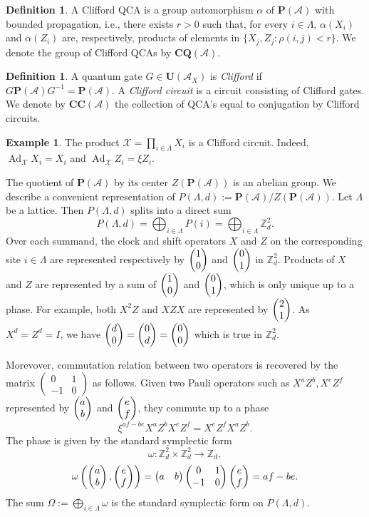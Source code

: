 \documentclass{article}
\theoremstyle{definition}
\newtheorem{defn}[theorem]{Definition}
\newtheorem{exmp}[theorem]{Example}
\newcommand*\colvec[3][]{
    \begin{pmatrix}\ifx\relax#1\relax\else#1\\\fi#2\\#3\end{pmatrix}
}
\DeclareMathOperator{\Ad}{Ad}
\newcommand{\ZZ}{{\mathbb Z}}
\newcommand{\SA}{{\mathscr A}}
\begin{document}
\begin{defn} \label{defn: CQ}
    A Clifford QCA is a group automorphism $\alpha$ of $\mathbf P(\SA)$ with bounded propagation, i.e., there exists $r>0$ such that, for every $i\in \Lambda$, $\alpha(X_i)$ and $\alpha(Z_i)$ are, respectively, products of elements in $\{X_j, Z_j: \rho(i,j)<r\}$. We denote the group of Clifford QCAs by $\mathbf{CQ}(\SA)$. 
\end{defn}
\begin{defn}
    A quantum gate $G\in \mathbf U(\SA_X)$ is \textit{Clifford} if $G\mathbf P(\SA)G^{-1}=\mathbf P(\SA)$. A \textit{Clifford circuit} is a circuit consisting of Clifford gates. We denote by $\mathbf{CC}(\SA)$ the collection of QCA's equal to conjugation by Clifford circuits.
\end{defn}
\begin{exmp}
    The product $\mathcal X=\prod_{i\in \Lambda}X_i$ is a Clifford circuit. Indeed, $\Ad_\mathcal{X} X_i=X_i$ and $\Ad_\mathcal{X} Z_i=\xi Z_i.$ 
\end{exmp}

The quotient of $\mathbf P(\SA)$ by its center $Z(\mathbf P(\SA))$ is an abelian group. We describe a convenient representation of $P(\Lambda, d):=\mathbf P(\SA)/Z(\mathbf P(\SA))$. Let $\Lambda$ be a lattice. Then $P(\Lambda, d)$ splits into a direct sum $$P(\Lambda, d)=\bigoplus_{i\in \Lambda} P(i)=\bigoplus_{i\in \Lambda} \ZZ_d^2.$$ Over each summand, the clock and shift operators $X$ and $Z$ on the corresponding site $i\in \Lambda$ are represented respectively by $\colvec{1}{0}$ and $\colvec{0}{1}$ in $\ZZ_d^2$. Products of $X$ and $Z$ are represented by a sum of $\colvec{1}{0}$ and $\colvec{0}{1}$, which is only unique up to a phase. For example, both $X^2Z$ and $XZX$ are represented by $\colvec{2}{1}$. As $X^d= Z^d= I$, we have $\colvec{d}{0}=\colvec{0}{d}=\colvec{0}{0}$ which is true in $\ZZ_d^2.$

Morevover, commutation relation between two operators is recovered by the matrix $\begin{pmatrix}
    0 & 1\\
    -1 & 0
\end{pmatrix}$ as follows. Given two Pauli operators such as $X^aZ^b, X^eZ^f$ represented by $\colvec{a}{b}$ and $\colvec{e}{f}$, they commute up to a phase
$$\xi^{af-be}X^aZ^b X^eZ^f=X^eZ^fX^aZ^b.$$
 The phase is given by the standard symplectic form 
\begin{equation}
\omega: \ZZ_d^2\times \ZZ_d^2 \rightarrow \ZZ_d, 
\end{equation}$$\omega\left(\colvec{a}{b}, \colvec{e}{f}\right)=
\begin{pmatrix}
    a & b
\end{pmatrix} 
\begin{pmatrix}
    0 & 1\\
    -1 & 0
\end{pmatrix}  \colvec{e}{f}=af-be.
$$
The sum $\Omega:=\bigoplus_{i\in \Lambda}\omega$ is the standard symplectic form on $P(\Lambda, d)$.
\end{document}
